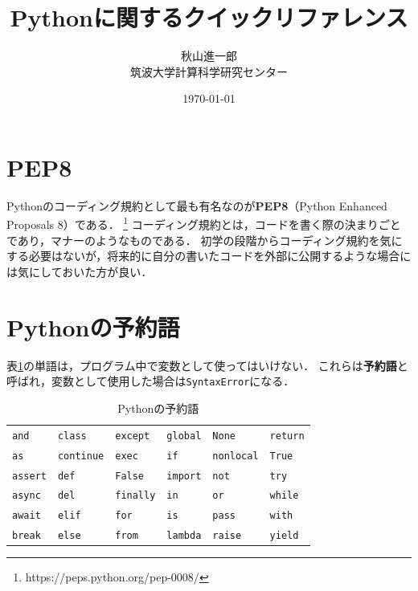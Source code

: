 \documentclass[a4paper,12pt]{jsarticle}
\title{Pythonに関するクイックリファレンス}
\author{秋山進一郎\\筑波大学計算科学研究センター}
\date{\today}
\begin{document}
\maketitle
\tableofcontents

\section{PEP8}

Pythonのコーディング規約として最も有名なのが{\bf PEP8}（Python Enhanced Proposals 8）である．
\footnote{https://peps.python.org/pep-0008/}
コーディング規約とは，コードを書く際の決まりごとであり，マナーのようなものである．
初学の段階からコーディング規約を気にする必要はないが，将来的に自分の書いたコードを外部に公開するような場合には気にしておいた方が良い．


\section{Pythonの予約語}

表\ref{tab:out_of_use}の単語は，プログラム中で変数として使ってはいけない．
これらは{\bf 予約語}と呼ばれ，変数として使用した場合は\texttt{SyntaxError}になる．

\begin{table}[H]
    \centering
    \caption{Pythonの予約語}
    \begin{tabular}{llllll}
        \hline
        \texttt{and} & \texttt{class} & \texttt{except} & \texttt{global} & \texttt{None} & \texttt{return} \\
        \texttt{as} & \texttt{continue} & \texttt{exec} & \texttt{if} & \texttt{nonlocal} & \texttt{True} \\
        \texttt{assert} & \texttt{def} & \texttt{False} & \texttt{import} & \texttt{not} & \texttt{try} \\
        \texttt{async} & \texttt{del} & \texttt{finally} & \texttt{in} & \texttt{or} & \texttt{while} \\
        \texttt{await} & \texttt{elif} & \texttt{for} & \texttt{is} & \texttt{pass} & \texttt{with} \\
        \texttt{break} & \texttt{else} & \texttt{from} & \texttt{lambda} & \texttt{raise} & \texttt{yield} \\
        \hline
    \end{tabular}
    \label{tab:out_of_use}
\end{table}
\end{document}
